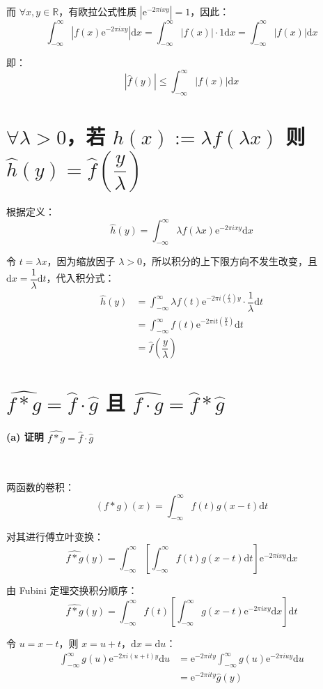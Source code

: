 \documentclass{article}
\newcommand{\e}{\mathrm{e}}
\renewcommand{\d}{\mathrm{d}}
\begin{document}
而 $\forall x,y\in\mathbb{R}$，有欧拉公式性质 $|\e^{-2\pi i xy}| = 1$，因此：
\[ \int_{-\infty}^{\infty} \left| f(x)\e^{-2\pi i xy} \right| \d x = \int_{-\infty}^{\infty} |f(x)|\cdot 1 \d x = \int_{-\infty}^{\infty} |f(x)| \d x \]

即：
\[ |\hat{f}(y)| \leqslant \int_{-\infty}^{\infty} |f(x)|\d x \]



\section{$\forall \lambda > 0$，若 $h(x) := \lambda f(\lambda x)$ 则 $\hat{h}(y) = \hat{f}\left(\dfrac{y}{\lambda}\right)$}
根据定义：
\[ \hat{h}(y) = \int_{-\infty}^{\infty} \lambda f(\lambda x)\e^{-2\pi i xy} \d x \]

令 $t = \lambda x$，因为缩放因子 $\lambda > 0$，所以积分的上下限方向不发生改变，且 $\d x = \dfrac{1}{\lambda} \d t$，代入积分式：
\begin{align*}
    \hat{h}(y) &= \int_{-\infty}^{\infty} \lambda f(t)\e^{-2\pi i \left(\tfrac{t}{\lambda}\right)y} \cdot \dfrac{1}{\lambda} \d t
    \\
    &= \int_{-\infty}^{\infty} f(t)\e^{-2\pi i t \left(\tfrac{y}{\lambda}\right)} \d t
    \\
    &= \hat{f}\left(\dfrac{y}{\lambda}\right)
\end{align*}



\section{$\widehat{f * g} = \hat{f} \cdot \hat{g}$ 且 $\widehat{f \cdot g} = \hat{f} * \hat{g}$}
\paragraph*{(a) 证明 $\widehat{f * g} = \hat{f} \cdot \hat{g}$}~{\\[-7pt]}

两函数的卷积：
\[ (f * g)(x) = \int_{-\infty}^{\infty} f(t)g(x-t) \d t \]

对其进行傅立叶变换：
\[ \widehat{f * g}(y) = \int_{-\infty}^{\infty} \left[ \int_{-\infty}^{\infty} f(t)g(x-t) \d t \right] \e^{-2\pi i xy} \d x \]

由 Fubini 定理交换积分顺序：
\[ \widehat{f * g}(y) = \int_{-\infty}^{\infty} f(t) \left[ \int_{-\infty}^{\infty} g(x-t)\e^{-2\pi i xy} \d x \right] \d t \]

令 $u = x - t$，则 $x = u + t$，$\d x = \d u$：
\begin{align*}
    \int_{-\infty}^{\infty} g(u)\e^{-2\pi i (u+t)y} \d u &= \e^{-2\pi i ty} \int_{-\infty}^{\infty} g(u)\e^{-2\pi i uy} \d u
    \\
    &= \e^{-2\pi i ty} \hat{g}(y)
\end{align*}
\end{document}

